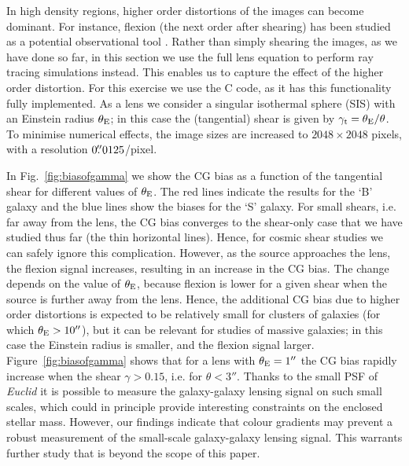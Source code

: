 \documentclass[useAMS,usenatbib]{mnras}
\begin{document}
In high density regions, higher order distortions of the images can become dominant. For instance, flexion (the next order after shearing) has been studied as a potential observational tool
\citep[e.g.][]{2002ApJ...564...65G,bacon2006}. Rather than simply shearing the images, as we have done so far, in this section we use the full lens equation to perform ray tracing simulations instead. This enables
us to capture the effect of the higher order distortion. For this exercise we use the {\sc C} code, as it has
this functionality fully implemented. As a lens we consider a singular isothermal sphere (SIS) with
an Einstein radius $\theta_{\rm E}$; in this case the (tangential) shear is given by 
$\gamma_{\rm t}=$\textonehalf$\,\theta_{\rm E}/\theta$. To minimise numerical effects, the image sizes are increased to $2048\times2048$ pixels, with a resolution $0\hbox{$.\!\!^{\prime\prime}$}0125$/pixel. 

In Fig.~\ref{fig:biasofgamma} we show the CG bias as a function of the tangential shear
for different values of $\theta_{\rm E}$. The red lines indicate the results for the `B' galaxy
and the blue lines show the biases for the `S' galaxy. For small shears, i.e. far away from the lens,
the CG bias converges to the shear-only case that we have studied thus far (the thin horizontal lines).
Hence, for cosmic shear studies we can safely ignore this complication. However, as the source approaches the lens, the flexion signal increases, resulting in an increase in the  CG bias. The change depends on the value of $\theta_{\rm E}$, because flexion is lower for a given shear when the source is further away from the lens. Hence, the additional CG bias due to higher order distortions is expected to be relatively small for clusters of galaxies (for which $\theta_{\rm E}>10''$), but it can be relevant for studies 
of massive galaxies; in this case the Einstein radius is smaller, and the flexion signal larger. Figure~\ref{fig:biasofgamma} shows that for a lens with $\theta_{\rm E}=1''$ the CG bias rapidly increase when the shear $\gamma>0.15$, i.e. for $\theta<3''$. Thanks to the small PSF of {\it Euclid} it is possible to measure the galaxy-galaxy lensing signal on such small scales, which could in principle provide interesting constraints on the enclosed stellar mass. However, our findings indicate that colour gradients may prevent a robust measurement of the small-scale galaxy-galaxy lensing signal. This warrants further study that is beyond the scope of this paper.
\end{document}
